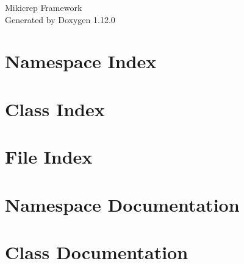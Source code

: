 \documentclass[twoside]{book}
\newcommand{\+}{\discretionary{\mbox{\scriptsize$\hookleftarrow$}}{}{}}
\newcommand{\clearemptydoublepage}{%
    \newpage{\pagestyle{empty}\cleardoublepage}%
  }
\begin{document}
  \raggedbottom
    \hypersetup{pageanchor=false,
                bookmarksnumbered=true,
                pdfencoding=unicode
               }
  \begin{titlepage}
  \vspace*{7cm}
  \begin{center}%
  {\Large Mikicrep Framework}\\
  \vspace*{1cm}
  {\large Generated by Doxygen 1.12.0}\\
  \end{center}
  \end{titlepage}
  \clearemptydoublepage
  \tableofcontents
  \clearemptydoublepage
  \hypersetup{pageanchor=true}
\chapter{Namespace Index}

\chapter{Class Index}

\chapter{File Index}

\chapter{Namespace Documentation}








\chapter{Class Documentation}















\end{document}
